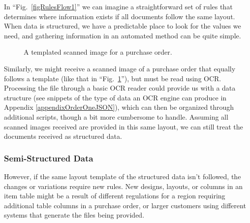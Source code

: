 \documentclass[conference, draftcls]{IEEEtran}
\begin{document}
In ``Fig.~\ref{figRulesFlow1}'' we can imagine a straightforward set of rules that determines where information exists if all documents follow the same layout. When data is structured, we have a predictable place to look for the values we need, and gathering information in an automated method can be quite simple.

\begin{figure}[ht]
\centerline{
}
\caption{A templated scanned image for a purchase order.}
\label{figScanned1}
\end{figure}

Similarly, we might receive a scanned image of a purchase order that equally follows a template (like that in ``Fig.~\ref{figScanned1}''), but must be read using OCR. Processing the file through a basic OCR reader could provide us with a data structure (see snippets of the type of data an OCR engine can produce in Appendix \ref{appendixOrderOneJSON}), which can then be organized through additional scripts, though a bit more cumbersome to handle. Assuming all scanned images received are provided in this same layout, we can still treat the documents received as structured data.

\subsubsection{Semi-Structured Data}
However, if the same layout template of the structured data isn't followed, the changes or variations require new rules. New designs, layouts, or columns in an item table might be a result of different regulations for a region requiring additional table columns in a purchase order, or larger customers using different systems that generate the files being provided.
\end{document}
